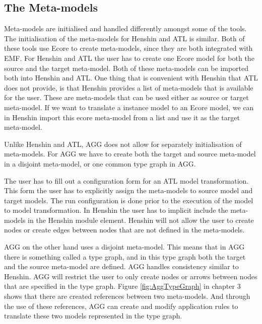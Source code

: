 \subsection{The Meta-models}
Meta-models are initialised and handled differently amongst some of the tools.
The initialisation of the meta-models for Henshin and ATL is similar. Both of
these tools use Ecore to create meta-models, since they are both integrated with
EMF. For Henshin and ATL the user has to create one Ecore model for both the
source and the target meta-model. Both of these meta-models can be imported both
into Henshin and ATL. One thing that is convenient with Henshin that ATL does
not provide, is that Henshin provides a list of meta-models that is available
for the user. These are meta-models that can be used either as source or target
meta-model. If we want to translate a instance model to an Ecore model, we can
in Henshin import this ecore meta-model from a list and use it as the target meta-model.

Unlike Henshin and ATL, AGG does not allow for separately initialisation of
meta-models. For AGG we have to create both the target and source meta-model in a
disjoint meta-model, or one common type graph in AGG.

The user has to fill out a configuration form for an ATL model transformation.
This form the user has to explicitly assign the meta-models to source model and
target models. The run configuration is done prior to the execution of the model
to model transformation. In Henshin the user has to implicit include the
meta-models in the Henshin module element. Henshin will not allow the user to
create nodes or create edges between nodes that are not defined in the
meta-models. 

AGG on the other hand uses a disjoint meta-model. This means that in AGG there
is something called a type graph, and in this type graph both the target and
the source meta-model are defined. AGG handles consistency similar to
Henshin. AGG will restrict the user to only create nodes or arrows between
nodes that are specified in the type graph. Figure \ref{fig:AggTypeGraph}
in chapter 3 shows that there are created references between two meta-models. And
through the use of these references, AGG can create and modify application
rules to translate these two models represented in the type graph. 
 
